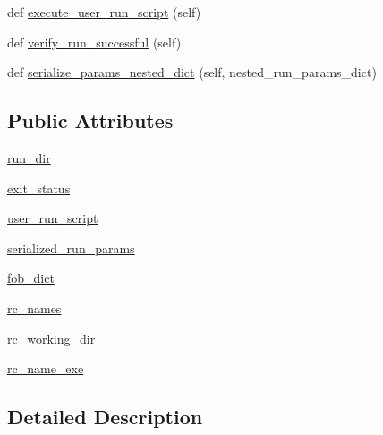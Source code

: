 \begin{DoxyCompactItemize}
\item 
def \hyperlink{classcodar_1_1cheetah_1_1report__generator_1_1___run_parser_a6f472eca96bec87e42cda64c9700a878}{execute\+\_\+user\+\_\+run\+\_\+script} (self)
\item 
def \hyperlink{classcodar_1_1cheetah_1_1report__generator_1_1___run_parser_a7903f37cfae3abbf922c55e83b214567}{verify\+\_\+run\+\_\+successful} (self)
\item 
def \hyperlink{classcodar_1_1cheetah_1_1report__generator_1_1___run_parser_acb1d5e6c741abe1fe06169eb3f260e2a}{serialize\+\_\+params\+\_\+nested\+\_\+dict} (self, nested\+\_\+run\+\_\+params\+\_\+dict)
\end{DoxyCompactItemize}
\subsection*{Public Attributes}
\begin{DoxyCompactItemize}
\item 
\hyperlink{classcodar_1_1cheetah_1_1report__generator_1_1___run_parser_a3ff56d7407ca9372a0dbf4fbd9833a4f}{run\+\_\+dir}
\item 
\hyperlink{classcodar_1_1cheetah_1_1report__generator_1_1___run_parser_a79072bedc0a276eacde6ba103d66faa2}{exit\+\_\+status}
\item 
\hyperlink{classcodar_1_1cheetah_1_1report__generator_1_1___run_parser_a097d306435fd27ce194c1b408fda8b5b}{user\+\_\+run\+\_\+script}
\item 
\hyperlink{classcodar_1_1cheetah_1_1report__generator_1_1___run_parser_a4396d67ff4f741c09c834bac31268b1c}{serialized\+\_\+run\+\_\+params}
\item 
\hyperlink{classcodar_1_1cheetah_1_1report__generator_1_1___run_parser_a45cde7c2727323b3e56a83e4105acf00}{fob\+\_\+dict}
\item 
\hyperlink{classcodar_1_1cheetah_1_1report__generator_1_1___run_parser_a432368ec8a5d1eb132e6b7b15c48a69a}{rc\+\_\+names}
\item 
\hyperlink{classcodar_1_1cheetah_1_1report__generator_1_1___run_parser_aa21334878df2ec2f8c326dd0d07de5f3}{rc\+\_\+working\+\_\+dir}
\item 
\hyperlink{classcodar_1_1cheetah_1_1report__generator_1_1___run_parser_a06dac6d0ee29a8d6f24aa26c478b259e}{rc\+\_\+name\+\_\+exe}
\end{DoxyCompactItemize}


\subsection{Detailed Description}


